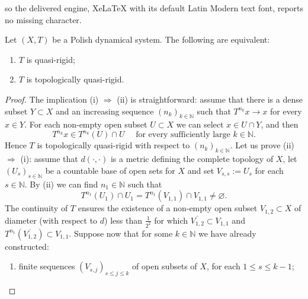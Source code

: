 \documentclass[10pt,a4paper]{amsart}
\newcommand{\NN}{\mathbb{N}}
\newcommand{\cl}{\overline}
\begin{document}
so the delivered engine, XeLaTeX with its default Latin Modern text font, reports no missing character.
\begin{proposition}\label{Pro:qr.complete}
	Let $(X,T)$ be a Polish dynamical system. The following are equivalent:
	\begin{enumerate}[{\em(i)}]
		\item $T$ is quasi-rigid;
		
		\item $T$ is topologically quasi-rigid.
	\end{enumerate}  
\end{proposition}

\begin{proof}
	The implication (i) $\Rightarrow$ (ii) is straightforward: assume that there is a dense subset $Y \subset X$ and an increasing sequence $(n_k)_{k\in\NN}$ such that $T^{n_k}x \to x$ for every $x \in Y$. For each non-empty open subset $U \subset X$ we can select $x \in U \cap Y$, and then
	\[
	T^{n_k}x \in T^{n_k}(U) \cap U \quad \text{ for every sufficiently large } k \in \NN.
	\]
	Hence $T$ is topologically quasi-rigid with respect to $(n_k)_{k\in\NN}$. Let us prove (ii) $\Rightarrow$ (i): assume that $d(\cdot,\cdot)$ is a metric defining the complete topology of $X$, let $(U_s)_{s\in\NN}$ be a countable base of open sets for $X$ and set $V_{s,s}:=U_s$ for each $s \in \NN$. By (ii) we can find $n_1 \in \NN$ such that
	\[
	T^{n_1}(U_1) \cap U_1 = T^{n_1}(V_{1,1}) \cap V_{1,1} \neq \varnothing.
	\]
	The continuity of $T$ ensures the existence of a non-empty open subset $V_{1,2} \subset X$ of diameter (with respect to $d$) less than $\frac{1}{2^2}$ for which $\cl{V_{1,2}} \subset V_{1,1}$ and $T^{n_1}\left(\cl{V_{1,2}}\right) \subset V_{1,1}$. Suppose now that for some $k \in \NN$ we have already constructed:
	\begin{enumerate}[--]
		\item finite sequences $(V_{s,j})_{s\leq j\leq k}$ of open subsets of $X$, for each $1\leq s\leq k-1$;
		

\end{enumerate}
\end{proof}
\end{document}
